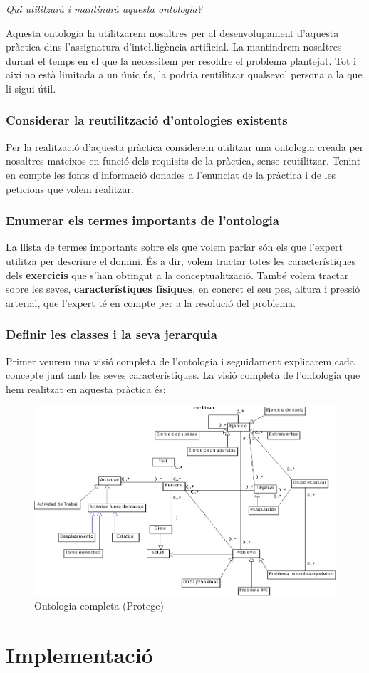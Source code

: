 \documentclass[a4paper, 12pt, UTF8]{article}
\begin{document}
\emph{Qui utilitzarà i mantindrà aquesta ontologia?}

Aquesta ontologia la utilitzarem nosaltres per al desenvolupament d'aquesta pràctica dins l'assignatura d'inte\l.ligència artificial. La mantindrem nosaltres durant el temps en el que la necessitem per resoldre el problema plantejat. Tot i així no està limitada a un únic ús, la podria reutilitzar qualsevol persona a la que li sigui útil.

\subsubsection{Considerar la reutilització d'ontologies existents}

Per la realització d'aquesta pràctica considerem utilitzar una ontologia creada per nosaltres mateixos en funció dels requisits de la pràctica, sense reutilitzar. Tenint en compte les fonts d'informació donades a l'enunciat de la pràctica i de les peticions que volem realitzar.

\subsubsection{Enumerar els termes importants de l'ontologia}

La llista de termes importants sobre els que volem parlar són els que l'expert utilitza per descriure el domini. És a dir, volem tractar totes les característiques dels \textbf{exercicis} que s'han obtingut a la conceptualització. També volem tractar sobre les seves, \textbf{característiques físiques}, en concret el seu pes, altura i pressió arterial, que l'expert té en compte per a la resolució del problema. 

\subsubsection{Definir les classes i la seva jerarquia}

Primer veurem una visió completa de l'ontologia i seguidament explicarem cada concepte junt amb les seves característiques. La visió completa de l'ontologia que hem realitzat en aquesta pràctica és:

\begin{figure}[h!]
	\centering
	\includegraphics[width=\textwidth]{mainUML}
	\caption{Ontologia completa (Protege)}
\end{figure}

\pagebreak

\section{Implementació}
\end{document}

